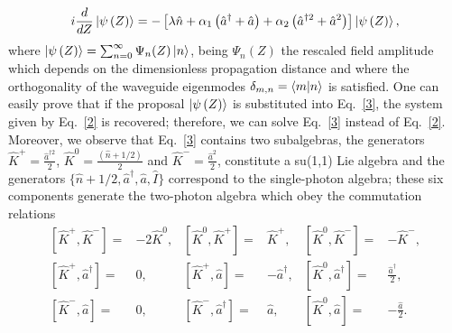 \documentclass[12pt]{article}
\numberwithin{equation}{section}
\begin{document}
\begin{equation} \label{3}
i\frac{d}{dZ} \ket{\psi\left(Z\right)}=-\left[ \lambda \hat{n} + \alpha_{1} \left(\hat{a}^{\dagger} + \hat{a}\right) + \alpha_{2} \left(\hat{a}^{\dagger2}  + \hat{a}^2\right)  \right] \ket{\psi\left(Z\right)},
\end{equation}
where $\ket{\psi\left(Z\right)}=\sum_{n=0}^{\infty} \Psi_{n}(Z) \ket{n}$, being  $\Psi_{n}(Z)$ the rescaled field amplitude which depends on the dimensionless propagation distance and where the orthogonality of the waveguide eigenmodes $\delta_{m,n}=\braket{m}{n}$ is satisfied. One can easily prove that if the proposal $\ket{\psi\left(Z\right)}$ is substituted into Eq.~\eqref{3}, the system given by Eq.~\eqref{2} is recovered; therefore, we can solve Eq.~\eqref{3} instead of Eq.~\eqref{2}. Moreover, we observe that Eq.~\eqref{3} contains two subalgebras, the generators $\hat{K}^{+}=\frac{\hat{a}^{\dagger2}}{2}$, $ \hat{K}^{0}=\frac{\left(\hat{n} + 1/2\right)}{2}$ and $ \hat{K}^{-}=\frac{\hat{a}^{2}}{2}$,  constitute a su(1,1) Lie algebra and the generators $\lbrace\hat{n} + 1/2, \hat{a}^{\dagger}, \hat{a}, \hat{I} \rbrace$ correspond to the single-photon algebra; these six components generate the two-photon algebra which obey the commutation relations
\begin{align} \label{4}
\left[\hat{K}^{+}, \hat{K}^{-} \right]=&-2\hat{K}^0, & \left[\hat{K}^{0}, \hat{K}^{+} \right]=&\hat{K}^{+}, & \left[\hat{K}^{0}, \hat{K}^{-} \right]=&- \hat{K}^{-}, \nonumber \\
\left[\hat{K}^{+}, \hat{a}^{\dagger} \right]=&0, & \left[\hat{K}^{+}, \hat{a} \right]=&-\hat{a}^{\dagger}, & \left[\hat{K}^{0}, \hat{a}^{\dagger} \right]=&\frac{\hat{a}^{\dagger}}{2}, \nonumber \\
\left[\hat{K}^{-}, \hat{a} \right]=&0, &  \left[\hat{K}^{-}, \hat{a}^{\dagger} \right]=& \hat{a}, & \left[\hat{K}^{0}, \hat{a} \right]=&-\frac{\hat{a}}{2}. 
\end{align}
\end{document}
